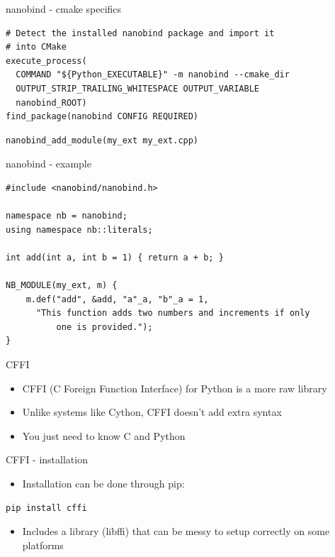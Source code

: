 \documentclass[presentation]{beamer}
\begin{document}
\begin{frame}[label=nanobind---cmake-specifics,fragile]{nanobind - cmake specifics}
 \begin{verbatim}
# Detect the installed nanobind package and import it
# into CMake
execute_process(
  COMMAND "${Python_EXECUTABLE}" -m nanobind --cmake_dir
  OUTPUT_STRIP_TRAILING_WHITESPACE OUTPUT_VARIABLE
  nanobind_ROOT)
find_package(nanobind CONFIG REQUIRED)
\end{verbatim}

\begin{verbatim}
nanobind_add_module(my_ext my_ext.cpp)
\end{verbatim}
\end{frame}
\begin{frame}[label=nanobind---example,fragile]{nanobind - example}
 \begin{verbatim}
#include <nanobind/nanobind.h>

namespace nb = nanobind;
using namespace nb::literals;

int add(int a, int b = 1) { return a + b; }

NB_MODULE(my_ext, m) {
    m.def("add", &add, "a"_a, "b"_a = 1,
      "This function adds two numbers and increments if only
          one is provided.");
}
\end{verbatim}
\end{frame}
\begin{frame}[label=cffi]{CFFI}
\begin{itemize}
\item CFFI (C Foreign Function Interface) for Python is a more raw library
\item Unlike systems like Cython, CFFI doesn't add extra syntax
\item You just need to know C and Python
\end{itemize}
\end{frame}
\begin{frame}[label=cffi---installation,fragile]{CFFI - installation}
 \begin{itemize}
\item Installation can be done through pip:
\end{itemize}

\begin{verbatim}
pip install cffi
\end{verbatim}

\begin{itemize}
\item Includes a library (libffi) that can be messy to setup correctly on
some platforms
\end{itemize}
\end{frame}
\end{document}
